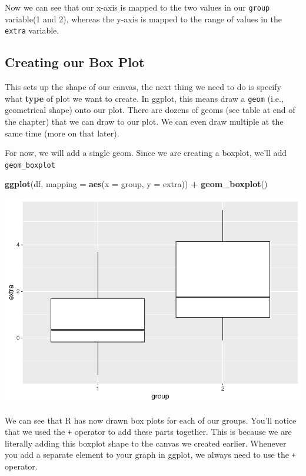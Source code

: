\documentclass[
]{book}
\newenvironment{Shaded}{\begin{snugshade}}{\end{snugshade}}
\newcommand{\AttributeTok}[1]{\textcolor[rgb]{0.13,0.29,0.53}{#1}}
\newcommand{\FunctionTok}[1]{\textcolor[rgb]{0.13,0.29,0.53}{\textbf{#1}}}
\newcommand{\NormalTok}[1]{#1}
\newcommand{\SpecialCharTok}[1]{\textcolor[rgb]{0.81,0.36,0.00}{\textbf{#1}}}
\begin{document}
Now we can see that our x-axis is mapped to the two values in our \texttt{group} variable(1 and 2), whereas the y-axis is mapped to the range of values in the \texttt{extra} variable.

\hypertarget{creating-our-box-plot}{%
\subsection{Creating our Box Plot}\label{creating-our-box-plot}}

This sets up the shape of our canvas, the next thing we need to do is specify what \textbf{type} of plot we want to create. In ggplot, this means draw a \texttt{geom} (i.e., geometrical shape) onto our plot. There are dozens of geoms (see table at end of the chapter) that we can draw to our plot. We can even draw multiple at the same time (more on that later).

For now, we will add a single geom. Since we are creating a boxplot, we'll add \texttt{geom\_boxplot}

\begin{Shaded}
\begin{Highlighting}[]
\FunctionTok{ggplot}\NormalTok{(df, }\AttributeTok{mapping =} \FunctionTok{aes}\NormalTok{(}\AttributeTok{x =}\NormalTok{ group, }\AttributeTok{y =}\NormalTok{ extra)) }\SpecialCharTok{+}
  \FunctionTok{geom\_boxplot}\NormalTok{()}
\end{Highlighting}
\end{Shaded}

\includegraphics{rintro_demo_files/figure-latex/unnamed-chunk-279-1.pdf}

We can see that R has now drawn box plots for each of our groups. You'll notice that we used the \texttt{+} operator to add these parts together. This is because we are literally adding this boxplot shape to the canvas we created earlier. Whenever you add a separate element to your graph in ggplot, we always need to use the \texttt{+} operator.
\end{document}
